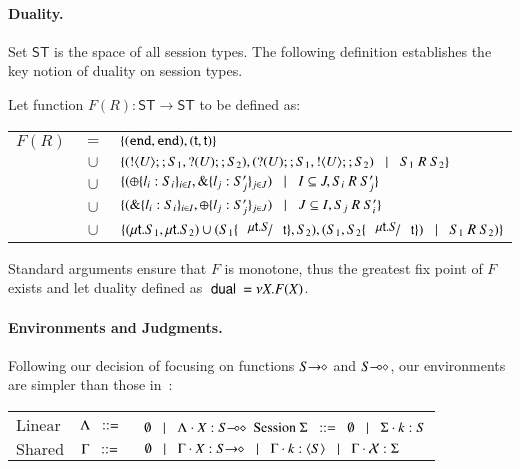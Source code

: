 \paragraph{Duality.}
Set $\mathsf{ST}$ is the space of all session types. The following definition establishes the key notion of duality on session types.
%
\begin{definition}[Duality]
	Let function $F(R): \mathsf{ST} \longrightarrow \mathsf{ST}$ to be defined as:

	\begin{tabular}{rcl}
		$F(R)$ &$=$&		$\{(\mathtt{end}, \mathtt{end}), (\mathsf{t}, \mathsf{t})\}$\\
			&$\cup$&	$\{(! \langle U \rangle ;;S_1, ? (U) ;; S_2), (? (U) ;;S_1, ! \langle U \rangle ;; S_2) \;\;\;|\;\;\; S_1\ R\ S_2\}$\\
			&$\cup$&	$\{(\oplus \{l_i: S_i\}_{i \in I}, \& \{l_j: S_j'\}_{j \in J}) \;\;\;|\;\;\; I \subseteq J, S_i\ R\ S_j'\}$\\
			&$\cup$&	$\{(\& \{l_i: S_i\}_{i \in I}, \oplus \{l_j: S_j'\}_{j \in J}) \;\;\;|\;\;\; J \subseteq I, S_j\ R\ S_i'\}$\\
			&$\cup$&	$\set{(\trec{t}{S_1}, \trec{t}{S_2}) \cup (S_1 \subst{\trec{t}{S}}{\vart{t}}, S_2), (S_1, S_2\subst{\trec{t}{S}}{\vart{t}}) \bnfbar S_1\ R\ S_2)}$
	\end{tabular}
	
\noindent
	Standard arguments ensure that $F$ is monotone, thus the greatest fix point
	of $F$ exists and let duality defined as $\ \mathsf{dual}\  = \nu X. F(X)$.
\end{definition}
%

\paragraph{Environments and Judgments.}
Following our decision of focusing on functions $S\!\! \rightarrow\!\! \diamond$ and $S\!\! \multimap\!\! \diamond$,
our environments are simpler than those in~\cite{tlca07}:

\begin{tabular}{lcl}
	$\text{Linear}$ & $\Lambda \;\;::=\;\;$ & $\emptyset \;\;\;|\;\;\; \Lambda \cdot X: S\!\! \multimap\!\! \diamond$ \qquad \qquad
	$\text{Session} \ \Sigma \;\;::=\;\; \emptyset \;\;\;|\;\;\; \Sigma \cdot k:S$
	\\
	$\text{Shared}$ & $\Gamma \;\;::=\;\;$ & $\emptyset \;\;\;|\;\;\; \Gamma \cdot X: S\!\! \rightarrow\!\! \diamond \;\;\;|\;\;\; \Gamma \cdot k: \langle S \rangle \;\;\;|\;\;\; \Gamma \cdot \mathcal{X}: \Sigma$
\end{tabular}

